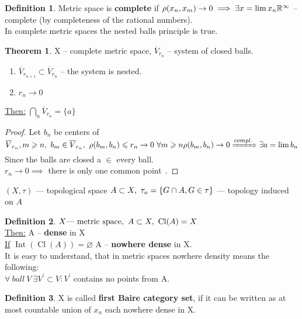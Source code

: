 \documentclass[12pt, fleqn]{article}
\theoremstyle{definition}
\newtheorem*{defn}{Definition}
\theoremstyle{break}
\newtheorem{thm}{Theorem}[section]
\theoremstyle{theorem}
\renewcommand\leq{\leqslant}
\renewcommand\geq{\geqslant}
\newcommand{\R}{\mathbb{R}}
\DeclareMathOperator{\clOp}{Cl}
\newcommand{\cl}[1]{\clOp({#1})}
\DeclareMathOperator{\intOp}{Int}
\newcommand{\inter}[1]{\intOp({#1})}
\begin{document}
\begin{defn}
  Metric space is \textbf{complete} if $\rho(x_n, x_m) \to 0 \implies \exists x = \lim x_n \\
  \R^\infty$ -- complete (by completeness of the rational numbers). \\
  In complete metric spaces the nested balls principle is true.
\end{defn}
\begin{thm}
  X -- complete metric space, $\overline{V}_{r_n}$ -- system of closed balls. \\
  \begin{enumerate}
      \item $\overline{V}_{r_{n + 1}} \subset \overline{V}_{r_n}$ -- the system is nested.
      \item $r_n \to 0$
    \end{enumerate}
  \underline{Then:} $\bigcap\limits_n \overline{V}_{r_n} = \{a\}$
\end{thm}
\begin{proof}
  Let $b_n$ be centers of $\overline{V}_{r_n}, \\
  m \geq n,\ b_m \in \overline{V}_{r_n},\ \rho(b_m, b_n) \leq r_n \to 0\ \forall m \geq n \\
  \rho(b_m, b_n) \to 0 \xRightarrow{compl.} \exists a = \lim b_n$
  Since the balls are closed a $\in$ every ball. \\
  $r_n \to 0 \implies$ there is only one common point $\qedhere$.
\end{proof}
\noindent
$(X, \tau)$ --- topological space
$\\A \subset X,\ \tau_a = \{G \cap A, G \in \tau\}$ --- topology induced on $A$
\begin{defn}
  $X \textnormal{--- metric space},\ A \subset X,\ \cl{A} = X$ \\
  \underline{Then:} A -- \textbf{dense} in X \\
  \underline{If} $\inter{\cl{A}} = \varnothing$ A -- \textbf{nowhere dense} in X. \\
  It is easy to understand, that in metric spaces nowhere density means the following: \\
  $\forall\ ball\ V\ \exists V^{'} \subset V\colon V^{'}$ contains no points from A.
\end{defn}
\begin{defn}
  X is called \textbf{first Baire category set}, if it can be written as at most
  countable union of $x_n$ each nowhere dense in X.
\end{defn}
\end{document}
